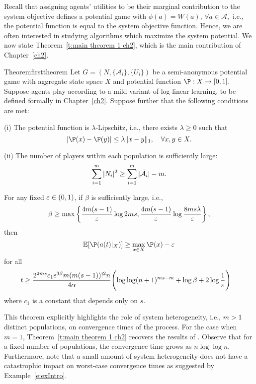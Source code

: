 Recall that assigning agents' utilities to be their marginal contribution to the system objective defines a potential game with $\phi(a) = W(a),\,\forall a\in \mathcal{A},$ i.e., the potential function is equal to the system objective function. Hence, we are often interested in studying algorithms which maximize the system potential. We now state Theorem~\ref{t:main theorem 1 ch2}, which is the main contribution of Chapter~\ref{ch2}.

\begin{restatable}{Theorem}{firsttheorem}\label{t:main theorem 1 ch2}
Let $G = (N,\{\mathcal{A}_i\},\{U_i\})$ be a semi-anonymous potential game with aggregate state space $X$ and potential function $\P:X\to [0,1].$ Suppose agents play according to a mild variant of log-linear learning, to be defined formally in Chapter~\ref{ch2}. Suppose further that the following conditions are met:         

\noindent (i)  The potential function is $\lambda$-Lipschitz, i.e., there exists $\lambda \geq 0$ such that
\begin{equation*}
|\P(x) - \P(y)|\leq\lambda\|x-y\|_1,\quad \forall x,y\in  X.
\end{equation*}

\noindent(ii) The number of players within each population is sufficiently large:
$$\sum_{i=1}^m |N_i|^2\geq \sum_{i=1}^m |\bar{{\cal A}}_i| - m.$$  

\noindent For any fixed $\varepsilon\in (0,1)$, if $\beta$ is sufficiently large, i.e., 
%
\begin{equation}\label{e:beta lb}
\beta\geq\max\left\{{4m(s-1)\over\varepsilon}\log 2ms,{4m(s-1)\over\varepsilon}\log{8ms \lambda\over\varepsilon}\right\},
\end{equation}
%
then
%
\begin{equation}\label{e:expected val}
\E[\P(a(t)|_{X})]\geq\max_{x\in X}\P(x)-\eps
\end{equation}
%
for all
%
\small
\begin{align}
t&\geq \frac{2^{2ms}c_1 e^{3\beta}m(m(s-1))!^2 n}{4\alpha}\Biggl(\log\log (n+1)^{ms - m} +\log\beta+ 2\log{1\over\varepsilon}\Biggr)\label{e:time requirement}
\end{align}
\normalsize
where $c_1$ is a constant that depends only on $s$.  
%
\end{restatable}

This theorem explicitly highlights the role of system heterogeneity, i.e., $m>1$ distinct populations, on convergence times of the process.  For the case when $m=1$, Theorem~\ref{t:main theorem 1 ch2} recovers the results of \cite{Shah2010}.  Observe that for a fixed number of populations, the convergence time grows as $n\log\log n$.  Furthermore, note that a small amount of system heterogeneity does not have a catastrophic impact on worst-case convergence times as suggested by Example~\ref{e:exIntro}.

